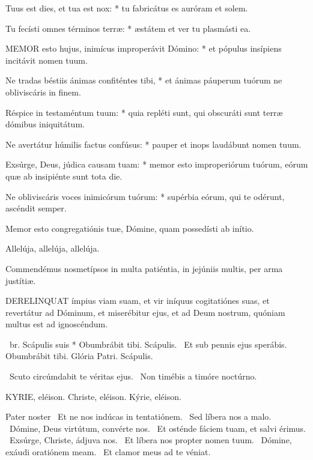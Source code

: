 Tuus est dies, et tua est nox: * tu fabricátus es auróram et solem.

Tu fecísti omnes términos terræ: * æstátem et ver tu plasmásti ea.


\lettrine[lines=2]{M}{EMOR} esto hujus, inimícus improperávit Dómino: * et pópulus insípiens incitávit nomen tuum.

Ne tradas béstiis ánimas confiténtes tibi, * et ánimas páuperum tuórum ne obliviscáris in finem.

Réspice in testaméntum tuum: * quia repléti sunt, qui obscuráti sunt terræ dómibus iniquitátum.

Ne avertátur húmilis factus confúsus: * pauper et inops laudábunt nomen tuum.

Exsúrge, Deus, júdica causam tuam: * memor esto improperiórum tuórum, eórum quæ ab insipiénte sunt tota die.

Ne obliviscáris voces inimicórum tuórum: * supérbia eórum, qui te odérunt, ascéndit semper.

  Memor esto congregatiónis tuæ, Dómine, quam possedísti ab inítio.

  Allelúja, allelúja, allelúja.



 Commendémus nosmetípsos in multa patiéntia, in jejúniis multis, per arma justítiæ.


\lettrine[lines=2]{D}{ERELINQUAT} ímpius viam suam, et vir iníquus cogitatiónes suas, et revertátur ad Dóminum, et miserébitur ejus, et ad Deum nostrum, quóniam multus est ad ignoscéndum.

\R\ br. Scápulis suis * Obumbrábit tibi. Scápulis. \V\ Et sub pennis ejus sperábis. Obumbrábit tibi. Glória Patri. Scápulis.

\V\ Scuto circúmdabit te véritas ejus. \R\ Non timébis a timóre noctúrno.


KYRIE, eléison. Christe, eléison. Kýrie, eléison.

Pater noster  \V\ Et ne nos indúcas in tentatiónem. \R\ Sed líbera nos a malo. \V\ Dómine, Deus virtútum, convérte nos. \R\ Et osténde fáciem tuam, et salvi érimus. \V\ Exsúrge, Christe, ádjuva nos. \R\ Et líbera nos propter nomen tuum. \V\ Dómine, exáudi oratiónem meam. \R\ Et clamor meus ad te véniat.


